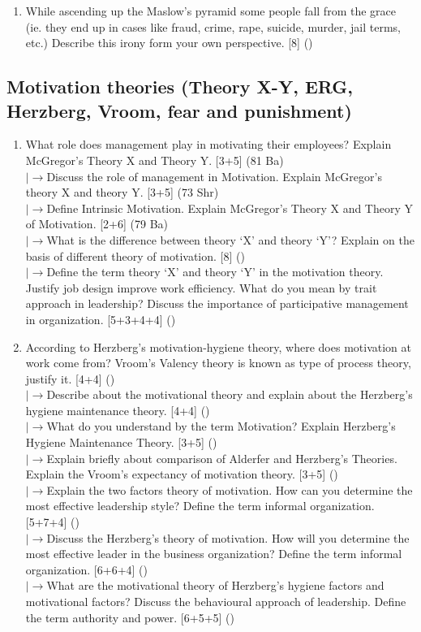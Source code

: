 \documentclass[12pt]{article}
\newcommand{\lb}{\\$\left|\rightarrow\right.$}
\begin{document}
\begin{enumerate}[topsep=0pt, noitemsep]
      \item While ascending up the Maslow's pyramid some people fall from the grace (ie. they end up in cases like fraud, crime, rape, suicide, murder, jail terms, etc.) Describe this irony form your own perspective. \hfill [8] ()
    \end{enumerate}

  \subsection{Motivation theories (Theory X-Y, ERG, Herzberg, Vroom, fear and punishment)}
    \begin{enumerate}[topsep=0pt, noitemsep]
      \item What role does management play in motivating their employees? Explain McGregor's Theory X and Theory Y. \hfill [3+5] (81 Ba)
        \lb Discuss the role of management in Motivation. Explain McGregor's theory X and theory Y. \hfill [3+5] (73 Shr)
        \lb Define Intrinsic Motivation. Explain McGregor's Theory X and Theory Y of Motivation. \hfill [2+6] (79 Ba)
        \lb What is the difference between theory `X' and theory `Y'? Explain on the basis of different theory of motivation. \hfill [8] ()
        \lb Define the term theory `X' and theory `Y' in the motivation theory. Justify job design improve work efficiency. What do you mean by trait approach in leadership? Discuss the importance of participative management in organization. \hfill [5+3+4+4] ()

      \item According to Herzberg's motivation-hygiene theory, where does motivation at work come from? Vroom's Valency theory is known as type of process theory, justify it. \hfill [4+4] ()
        \lb Describe about the motivational theory and explain about the Herzberg's hygiene maintenance theory. \hfill [4+4] ()
        \lb What do you understand by the term Motivation? Explain Herzberg's Hygiene Maintenance Theory. \hfill [3+5] ()
        \lb Explain briefly about comparison of Alderfer and Herzberg's Theories. Explain the Vroom's expectancy of motivation theory. \hfill [3+5] ()
        \lb Explain the two factors theory of motivation. How can you determine the most effective leadership style? Define the term informal organization. \hfill [5+7+4] ()
        \lb Discuss the Herzberg's theory of motivation. How will you determine the most effective leader in the business organization? Define the term informal organization. \hfill [6+6+4] ()
        \lb What are the motivational theory of Herzberg's hygiene factors and motivational factors? Discuss the behavioural approach of leadership. Define the term authority and power. \hfill [6+5+5] ()


\end{enumerate}
\end{document}
